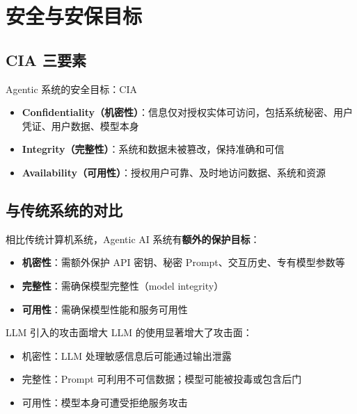 \section{安全与安保目标}

\subsection{CIA 三要素}

\begin{importantbox}{Agentic 系统的安全目标：CIA}
\begin{itemize}
    \item \textbf{Confidentiality（机密性）}：信息仅对授权实体可访问，包括系统秘密、用户凭证、用户数据、模型本身
    \item \textbf{Integrity（完整性）}：系统和数据未被篡改，保持准确和可信
    \item \textbf{Availability（可用性）}：授权用户可靠、及时地访问数据、系统和资源
\end{itemize}
\end{importantbox}

\subsection{与传统系统的对比}

相比传统计算机系统，Agentic AI 系统有\textbf{额外的保护目标}：
\begin{itemize}
    \item \textbf{机密性}：需额外保护 API 密钥、秘密 Prompt、交互历史、专有模型参数等
    \item \textbf{完整性}：需确保模型完整性（model integrity）
    \item \textbf{可用性}：需确保模型性能和服务可用性
\end{itemize}

\begin{warningbox}{LLM 引入的攻击面增大}
LLM 的使用显著增大了攻击面：
\begin{itemize}
    \item 机密性：LLM 处理敏感信息后可能通过输出泄露
    \item 完整性：Prompt 可利用不可信数据；模型可能被投毒或包含后门
    \item 可用性：模型本身可遭受拒绝服务攻击
\end{itemize}
\end{warningbox}

